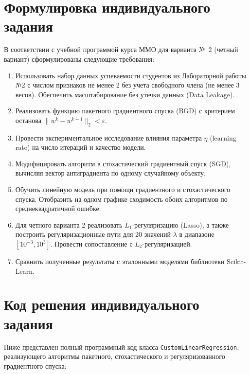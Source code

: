 \documentclass[14pt,a4paper]{extarticle}
\begin{document}
\section{Формулировка индивидуального задания}
В соответствии с учебной программой курса ММО для варианта №~2 (четный вариант) сформулированы следующие требования:
\begin{enumerate}
    \item Использовать набор данных успеваемости студентов из Лабораторной работы №2 с числом признаков не менее 2 без учета свободного члена (не менее 3 весов). Обеспечить масштабирование без утечки данных (Data Leakage).
    \item Реализовать функцию пакетного градиентного спуска (BGD) с критерием останова $\|w^k - w^{k-1}\|_2 < \varepsilon$.
    \item Провести экспериментальное исследование влияния параметра $\eta$ (learning rate) на число итераций и качество модели.
    \item Модифицировать алгоритм в стохастический градиентный спуск (SGD), вычисляя вектор антиградиента по одному случайному объекту.
    \item Обучить линейную модель при помощи градиентного и стохастического спуска. Отобразить на одном графике сходимость обоих алгоритмов по среднеквадратичной ошибке.
    \item Для четного варианта 2 реализовать $L_1$-регуляризацию (Lasso), а также построить регуляризационные пути для 20 значений $\lambda$ в диапазоне $[10^{-3}, 10^3]$. Провести сопоставление с $L_2$-регуляризацией.
    \item Сравнить полученные результаты с эталонными моделями библиотеки Scikit-Learn.
\end{enumerate}

\section{Код решения индивидуального задания}
Ниже представлен полный программный код класса \texttt{CustomLinearRegression}, реализующего алгоритмы пакетного, стохастического и регуляризованного градиентного спуска:
\end{document}
